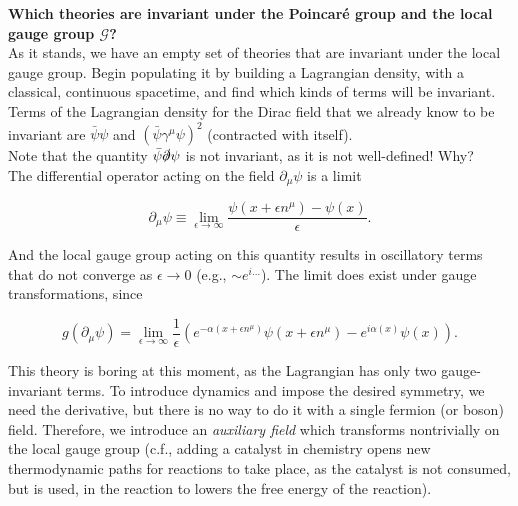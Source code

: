\noindent \textbf{Which theories are invariant under the Poincar\'e group and the local gauge group $\mathcal{G}$?} \\

\noindent As it stands, we have an empty set of theories that are invariant under the local gauge group. Begin populating it by building a Lagrangian density, with a classical, continuous spacetime, and find which kinds of terms will be invariant. \\

\noindent Terms of the Lagrangian density for the Dirac field that we already know to be invariant are $\bar{\psi}\psi$ and $(\bar{\psi} \gamma^\mu \psi)^2$ (contracted with itself). \\

\noindent Note that the quantity $\bar{\psi} \slashed{\partial} \psi$ is not invariant, as it is not well-defined!  Why? \\

\noindent The differential operator acting on the field $\partial_\mu \psi$ is a limit

\begin{equation}
\partial_\mu \psi \equiv \lim_{\epsilon \rightarrow \infty} \frac{ \psi(x + \epsilon n^\mu) - \psi(x)}{\epsilon}.
\end{equation}

\noindent And the local gauge group acting on this quantity results in oscillatory terms that do not converge as $\epsilon \rightarrow 0$ (e.g., $\sim e^{i\dots}$). The limit does exist under gauge transformations, since

\begin{equation}
g(\partial_\mu \psi) = \lim_{\epsilon \rightarrow \infty} \frac{1}{\epsilon} (e^{- \alpha(x + \epsilon n^\mu)} \psi(x + \epsilon n^\mu ) - e^{i \alpha(x)} \psi (x) ).
\end{equation}

\noindent This theory is boring at this moment, as the Lagrangian has only two gauge-invariant terms. To introduce dynamics and impose the desired symmetry, we need the derivative, but there is no way to do it with a single fermion (or boson) field. Therefore, we introduce an \textit{auxiliary field} which transforms nontrivially on the local gauge group (c.f., adding a catalyst in chemistry opens new thermodynamic paths for reactions to take place, as the catalyst is not consumed, but is used, in the reaction to lowers the free energy of the reaction). \\

